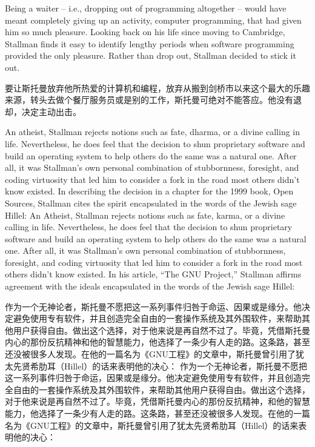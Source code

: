 \ifdefined\eng
Being a waiter -- i.e., dropping out of programming altogether -- would have meant completely giving up an activity, computer programming, that had given him so much pleasure. Looking back on his life since moving to Cambridge, Stallman finds it easy to identify lengthy periods when software programming provided the only pleasure. Rather than drop out, Stallman decided to stick it out.
\fi

\ifdefined\chs
要让斯托曼放弃他所热爱的计算机和编程，放弃从搬到剑桥市以来这个最大的乐趣来源，转头去做个餐厅服务员或是别的工作，斯托曼可绝对不能答应。他没有退却，决定主动出击。
\fi

\ifdefined\eng
\ifdefined\vone
An atheist, Stallman rejects notions such as fate, dharma, or a divine calling in life. Nevertheless, he does feel that the decision to shun proprietary software and build an operating system to help others do the same was a natural one. After all, it was Stallman's own personal combination of stubbornness, foresight, and coding virtuosity that led him to consider a fork in the road most others didn't know existed. In describing the decision in a chapter for the 1999 book, Open Sources, Stallman cites the spirit encapsulated in the words of the Jewish sage Hillel:
\fi
\ifdefined\vtwo
An Atheist, Stallman rejects notions such as fate, karma, or a divine calling in life. Nevertheless, he does feel that the decision to shun proprietary software and build an operating system to help others do the same was a natural one. After all, it was Stallman's own personal combination of stubbornness, foresight, and coding virtuosity that led him to consider a fork in the road most others didn't know existed. In his article, ``The GNU Project,'' Stallman affirms agreement with the ideals encapsulated in the words of the Jewish sage Hillel:
\fi
\fi

\ifdefined\chs
\ifdefined\vone
作为一个无神论者，斯托曼不愿把这一系列事件归咎于命运、因果或是缘分。他决定避免使用专有软件，并且创造完全自由的一套操作系统及其外围软件，来帮助其他用户获得自由。做出这个选择，对于他来说是再自然不过了。毕竟，凭借斯托曼内心的那份反抗精神和他的智慧能力，他选择了一条少有人走的路。这条路，甚至还没被很多人发现。在他的一篇名为《GNU工程》的文章中，斯托曼曾引用了犹太先贤希肋耳（Hillel）的话来表明他的决心：
\fi
\ifdefined\vtwo
作为一个无神论者，斯托曼不愿把这一系列事件归咎于命运，因果或是缘分。他决定避免使用专有软件，并且创造完全自由的一套操作系统及其外围软件，来帮助其他用户获得自由。做出这个选择，对于他来说是再自然不过了。毕竟，凭借斯托曼内心的那份反抗精神，和他的智慧能力，他选择了一条少有人走的路。这条路，甚至还没被很多人发现。在他的一篇名为《GNU工程》的文章中，斯托曼曾引用了犹太先贤希肋耳（Hillel）的话来表明他的决心：
\fi
\fi

